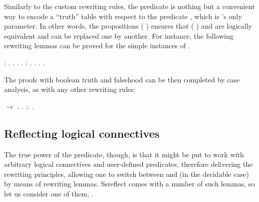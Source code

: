 \coqdocemptyline


Similarly to the custom rewriting rules, the  predicate is
nothing but a convenient way to encode a ``truth'' table with respect to
the predicate , which is 's only parameter. In other
words, the propositions (  ) ensures that ( ) and
 are logically equivalent and can be replaced one by another. For
instance, the following rewriting lemmas  can
be proved for the simple instances of .


\begin{coqdoccode}
\coqdocemptyline
\coqdocnoindent
{}  :   .\coqdoceol
\coqdocnoindent
{}.  . .\coqdoceol
\coqdocemptyline
\coqdocnoindent
{}  :   .\coqdoceol
\coqdocnoindent
{}.  . .\coqdoceol
\coqdocemptyline
\end{coqdoccode}


The proofs with boolean truth and falsehood can be then completed by
case analysis, as with any other rewriting rules:


\begin{coqdoccode}
\coqdocemptyline
\coqdocnoindent
{}  \ensuremath{\rightarrow} .\coqdoceol
\coqdocnoindent
{}.  :. .\coqdoceol
\coqdocemptyline
\end{coqdoccode}


\subsection{Reflecting logical connectives}




The true power of the  predicate, though, is that it might be
put to work with arbitrary logical connectives and user-defined
predicates, therefore delivering the rewriting principles, allowing
one to switch between  and  (in the decidable case) by
means of rewriting lemmas. Ssreflect comes with a number of such
lemmas, so let us consider one of them, .


